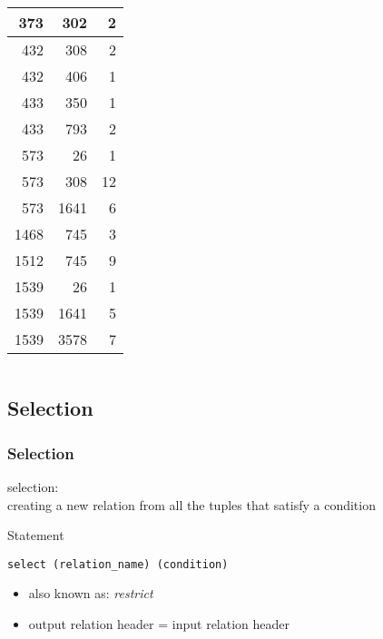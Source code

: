 \documentclass[dvipsnames]{beamer}
\theoremstyle{plain}
\begin{document}
\begin{frame}
\begin{example}
\begin{columns}[b]
      \begin{tiny}
      \begin{table}
        \begin{tabular}{|r|r|r|}\hline
    373 &     302 &   2\\\hline
    432 &     308 &   2\\\hline
    432 &     406 &   1\\\hline
    433 &     350 &   1\\\hline
    433 &     793 &   2\\\hline
    573 &      26 &   1\\\hline
    573 &     308 &  12\\\hline
    573 &    1641 &   6\\\hline
   1468 &     745 &   3\\\hline
   1512 &     745 &   9\\\hline
   1539 &      26 &   1\\\hline
   1539 &    1641 &   5\\\hline
   1539 &    3578 &   7\\\hline
        \end{tabular}
      \end{table}
      \end{tiny}
    \end{columns}
  \end{example}
\end{frame}

\subsection{Selection}

\begin{frame}[fragile]
  \frametitle{Selection}

  \begin{definition}
    \alert{selection}:\\
      creating a new relation from all the tuples that satisfy a condition
  \end{definition}

  \pause
  \begin{block}{Statement}
    \begin{lstlisting}
select (relation_name) (condition)
    \end{lstlisting}
  \end{block}

  \pause
  \begin{itemize}
    \item also known as: \emph{restrict}
    \item output relation header = input relation header
  \end{itemize}
\end{frame}
\end{document}
